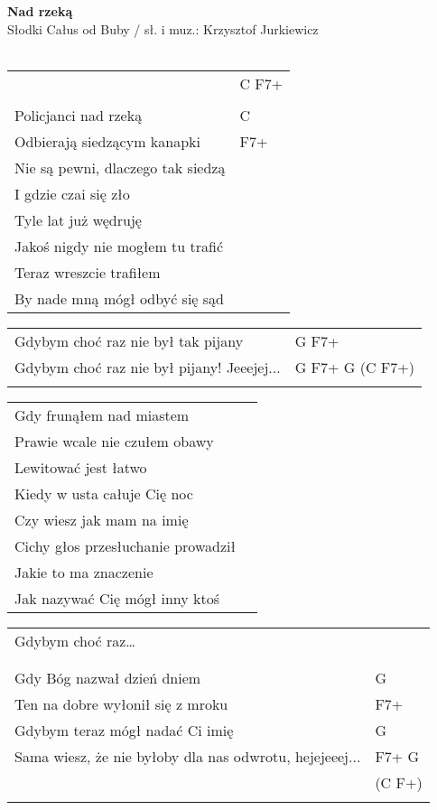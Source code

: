 \documentclass[a5paper]{article}
\begin{document}


\noindent
\fontsize{12pt}{15pt}\selectfont
\textbf{Nad rzeką} \\
\fontsize{8pt}{10pt}\selectfont
Słodki Całus od Buby / sł. i muz.: Krzysztof Jurkiewicz \\ \\
\fontsize{10pt}{12pt}\selectfont
{}
\begin{tabular}{@{}p{8.50cm}p{3cm}@{}}
\noindent
 & C F7+ \\ \\
Policjanci nad rzeką & C \\
Odbierają siedzącym kanapki & F7+ \\
Nie są pewni, dlaczego tak siedzą\\
I gdzie czai się zło\\
Tyle lat już wędruję\\
Jakoś nigdy nie mogłem tu trafić\\
Teraz wreszcie trafiłem\\
By nade mną mógł odbyć się sąd\\
\end{tabular}

\noindent
\begin{tabular}{@{}p{7.50cm}p{3cm}@{}}
Gdybym choć raz nie był tak pijany & G F7+\\
Gdybym choć raz nie był pijany! Jeeejej... & G F7+ G (C F7+)\\ \\
\end{tabular}

\noindent
\begin{tabular}{@{}p{7.50cm}p{3cm}@{}}
Gdy frunąłem nad miastem \\
Prawie wcale nie czułem obawy\\
Lewitować jest łatwo\\
Kiedy w usta całuje Cię noc\\
Czy wiesz jak mam na imię\\
Cichy głos przesłuchanie prowadził\\
Jakie to ma znaczenie\\
Jak nazywać Cię mógł inny ktoś\\
\end{tabular}

\noindent
\begin{tabular}{@{}p{7.50cm}p{3cm}@{}}
Gdybym choć raz… \\ \\
[reggae] \\
Gdy Bóg nazwał dzień dniem & G \\
Ten na dobre wyłonił się z mroku & F7+ \\
Gdybym teraz mógł nadać Ci imię & G \\
Sama wiesz, że nie byłoby dla nas odwrotu, hejejeeej... & F7+ G \\
& (C F+) \\ \\
\end{tabular}
\end{document}
